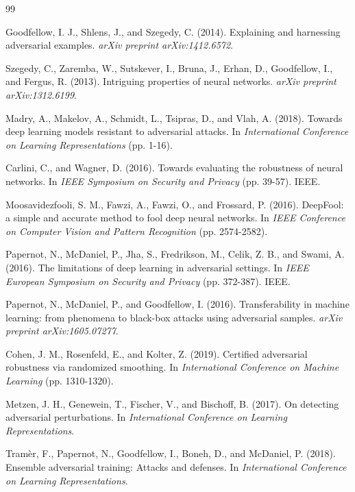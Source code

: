 \documentclass[10pt,conference]{IEEEtran}
\begin{document}
\begin{thebibliography}{99}

 Goodfellow, I. J., Shlens, J., and Szegedy, C. (2014). Explaining and harnessing adversarial examples. \textit{arXiv preprint arXiv:1412.6572}.

 Szegedy, C., Zaremba, W., Sutskever, I., Bruna, J., Erhan, D., Goodfellow, I., and Fergus, R. (2013). Intriguing properties of neural networks. \textit{arXiv preprint arXiv:1312.6199}.

 Madry, A., Makelov, A., Schmidt, L., Tsipras, D., and Vlah, A. (2018). Towards deep learning models resistant to adversarial attacks. In \textit{International Conference on Learning Representations} (pp. 1-16).

 Carlini, C., and Wagner, D. (2016). Towards evaluating the robustness of neural networks. In \textit{IEEE Symposium on Security and Privacy} (pp. 39-57). IEEE.

 Moosavidezfooli, S. M., Fawzi, A., Fawzi, O., and Frossard, P. (2016). DeepFool: a simple and accurate method to fool deep neural networks. In \textit{IEEE Conference on Computer Vision and Pattern Recognition} (pp. 2574-2582).

 Papernot, N., McDaniel, P., Jha, S., Fredrikson, M., Celik, Z. B., and Swami, A. (2016). The limitations of deep learning in adversarial settings. In \textit{IEEE European Symposium on Security and Privacy} (pp. 372-387). IEEE.

 Papernot, N., McDaniel, P., and Goodfellow, I. (2016). Transferability in machine learning: from phenomena to black-box attacks using adversarial samples. \textit{arXiv preprint arXiv:1605.07277}.

 Cohen, J. M., Rosenfeld, E., and Kolter, Z. (2019). Certified adversarial robustness via randomized smoothing. In \textit{International Conference on Machine Learning} (pp. 1310-1320).

 Metzen, J. H., Genewein, T., Fischer, V., and Bischoff, B. (2017). On detecting adversarial perturbations. In \textit{International Conference on Learning Representations}.

 Tramèr, F., Papernot, N., Goodfellow, I., Boneh, D., and McDaniel, P. (2018). Ensemble adversarial training: Attacks and defenses. In \textit{International Conference on Learning Representations}.


\end{thebibliography}
\end{document}
